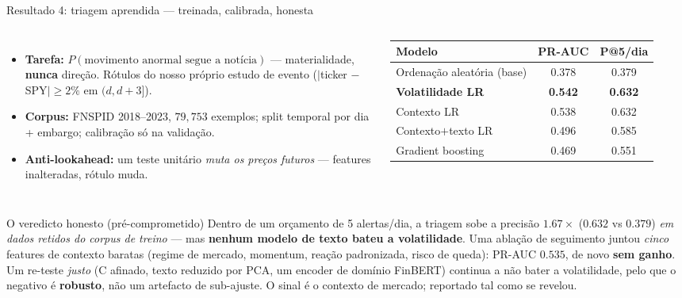 \documentclass[aspectratio=169]{beamer}
\begin{document}
\begin{frame}{Resultado 4: triagem aprendida --- treinada, calibrada, honesta}
\begin{columns}
\begin{itemize}\small
  \item \textbf{Tarefa:} $P(\text{movimento anormal segue a notícia})$ --- materialidade, \textbf{nunca} direção. Rótulos do nosso próprio estudo de evento ($|$ticker $-$ SPY$| \ge 2\%$ em $(d,d{+}3]$).
  \item \textbf{Corpus:} FNSPID 2018--2023, $79{,}753$ exemplos; split temporal por dia + embargo; calibração só na validação.
  \item \textbf{Anti-lookahead:} um teste unitário \emph{muta os preços futuros} --- features inalteradas, rótulo muda.
\end{itemize}
\scriptsize
\begin{tabular}{l c c}
\toprule
Modelo & PR-AUC & P@5/dia \\
\midrule
Ordenação aleatória (base) & 0.378 & 0.379 \\
\textbf{Volatilidade LR} & \textbf{0.542} & \textbf{0.632} \\
Contexto LR & 0.538 & 0.632 \\
Contexto$+$texto LR & 0.496 & 0.585 \\
Gradient boosting & 0.469 & 0.551 \\
\bottomrule
\end{tabular}
\end{columns}
\vfill
\begin{block}{\small O veredicto honesto (pré-comprometido)}
\small Dentro de um orçamento de 5 alertas/dia, a triagem sobe a precisão \textbf{$1.67\times$} ($0.632$ vs $0.379$) \emph{em dados retidos do corpus de treino} --- mas \textbf{nenhum modelo de texto bateu a volatilidade}. Uma ablação de seguimento juntou \emph{cinco} features de contexto baratas (regime de mercado, momentum, reação padronizada, risco de queda): PR-AUC $0.535$, de novo \textbf{sem ganho}. Um re-teste \emph{justo} (C afinado, texto reduzido por PCA, um encoder de domínio FinBERT) continua a não bater a volatilidade, pelo que o negativo é \textbf{robusto}, não um artefacto de sub-ajuste. O sinal é o contexto de mercado; reportado tal como se revelou.
\end{block}
\end{frame}
\end{document}
